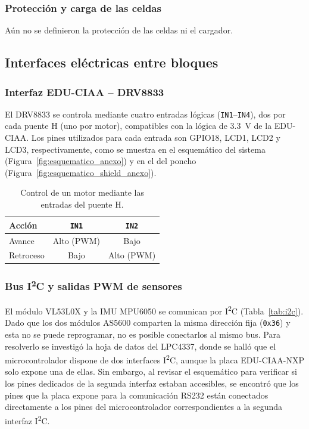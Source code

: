 \subsubsection{Protección y carga de las celdas}
Aún no se definieron la protección de las celdas ni el cargador.

\subsection{Interfaces eléctricas entre bloques}
\subsubsection{Interfaz EDU-CIAA -- DRV8833}
El DRV8833 se controla mediante cuatro entradas lógicas (\texttt{IN1}--\texttt{IN4}), dos por cada puente H (uno por motor), compatibles con la lógica de \SI{3,3}{V} de la EDU-CIAA.
Los pines utilizados para cada entrada son GPIO18, LCD1, LCD2 y LCD3, respectivamente, como se muestra en el esquemático del sistema (Figura~\ref{fig:esquematico_anexo}) y en el del poncho (Figura~\ref{fig:esquematico_shield_anexo}).

\begin{table}[H]
\centering
\caption{Control de un motor mediante las entradas del puente H.}
\label{tab:logica}
\begin{tabular}{lcc}
\toprule
Acción & \texttt{IN1} & \texttt{IN2} \\
\midrule
Avance & Alto (PWM) & Bajo \\
Retroceso & Bajo & Alto (PWM) \\
\bottomrule
\end{tabular}
\end{table}

\subsubsection{Bus \texorpdfstring{I\textsuperscript{2}C}{I2C} y salidas PWM de sensores}\label{sec:i2c}
El módulo VL53L0X y la IMU MPU6050 se comunican por I\textsuperscript{2}C (Tabla~\ref{tab:i2c}). Dado que los dos módulos AS5600 comparten la misma dirección fija (\texttt{0x36}) y esta no se puede reprogramar, no es posible conectarlos al mismo bus. Para resolverlo se investigó la hoja de datos del LPC4337, donde se halló que el microcontrolador dispone de dos interfaces I\textsuperscript{2}C, aunque la placa EDU-CIAA-NXP solo expone una de ellas. Sin embargo, al revisar el esquemático para verificar si los pines dedicados de la segunda interfaz estaban accesibles, se encontró que los pines que la placa expone para la comunicación RS232 están conectados directamente a los pines del microcontrolador correspondientes a la segunda interfaz I\textsuperscript{2}C.


